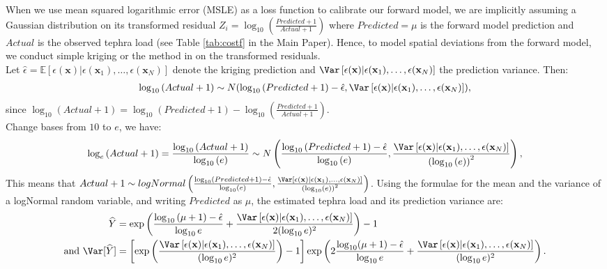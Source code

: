 When we use mean squared logarithmic error (MSLE) as a loss function to calibrate our forward model, we are implicitly assuming a Gaussian distribution on its transformed residual $Z_{i} = \log_{10}\left(\frac{Predicted + 1}{Actual + 1}\right)$ where $Predicted = \mu$ is the forward model prediction and $Actual$ is the observed tephra load (see Table \ref{tab:costf} in the Main Paper). Hence, to model spatial deviations from the forward model, we conduct simple kriging or the method in \cite{worden2018} on the transformed residuals. 
\\
Let $\hat{\epsilon} = \mathbb{E}\left[\epsilon(\mathbf{x})|\epsilon(\mathbf{x}_{1}), 
    \dots, \epsilon(\mathbf{x}_{N})\right]$ denote the kriging prediction and $\Var\left[\epsilon(\mathbf{x})|\epsilon(\mathbf{x}_{1}), 
    \dots, \epsilon(\mathbf{x}_{N})\right]$ the prediction variance. Then:
\begin{gather}
    \log_{10}\left(Actual + 1\right) \sim N(\log_{10}\left(Predicted + 1\right) - \hat{\epsilon}, \Var\left[\epsilon(\mathbf{x})|\epsilon(\mathbf{x}_{1}), 
    \dots, \epsilon(\mathbf{x}_{N})\right]),
\end{gather}
since $\log_{10}\left(Actual + 1\right) = \log_{10}\left(Predicted + 1\right) - \log_{10}\left(\frac{Predicted + 1}{Actual + 1}\right)$. 
\\
Change bases from $10$ to $e$, we have:
\begin{gather}
    \log_{e}\left(Actual + 1\right) = \frac{\log_{10}\left(Actual + 1\right)}{\log_{10}\left(e\right)} \sim N\left(\frac{\log_{10}\left(Predicted + 1\right) - \hat{\epsilon}}{\log_{10}\left(e\right)}, \frac{\Var\left[\epsilon(\mathbf{x})|\epsilon(\mathbf{x}_{1}), 
    \dots, \epsilon(\mathbf{x}_{N})\right]}{\left(\log_{10}\left(e\right)\right)^2}\right),
\end{gather}
This means that $Actual + 1 \sim logNormal\left(\frac{\log_{10}\left(Predicted + 1\right) - \hat{\epsilon}}{\log_{10}\left(e\right)}, \frac{\Var\left[\epsilon(\mathbf{x})|\epsilon(\mathbf{x}_{1}), 
    \dots, \epsilon(\mathbf{x}_{N})\right]}{\left(\log_{10}\left(e\right)\right)^2}\right)$. 
Using the formulae for the mean and the variance of a logNormal random variable, and writing $Predicted$ as $\mu$, the estimated tephra load and its prediction variance are:
\begin{align}
\widehat{Y} &= \exp\left(\frac{\log_{10}\left(\mu + 1\right) - \hat{\epsilon}}{\log_{10}e} + \frac{\Var\left[\epsilon(\mathbf{x})|\epsilon(\mathbf{x}_{1}), 
    \dots, \epsilon(\mathbf{x}_{N})\right]}{2(\log_{10}e)^2}\right) - 1 \\
\text{and } \Var[\widehat{Y}] &= \left[\exp\left(\frac{\Var\left[\epsilon(\mathbf{x})|\epsilon(\mathbf{x}_{1}), 
    \dots, \epsilon(\mathbf{x}_{N})\right]}{(\log_{10}e)^2}\right) - 1\right]\exp\left(2\frac{\log_{10}(\mu + 1) - \hat{\epsilon}}{\log_{10}e} + \frac{\Var\left[\epsilon(\mathbf{x})|\epsilon(\mathbf{x}_{1}), 
    \dots, \epsilon(\mathbf{x}_{N})\right]}{(\log_{10}e)^2}\right).
\end{align}


